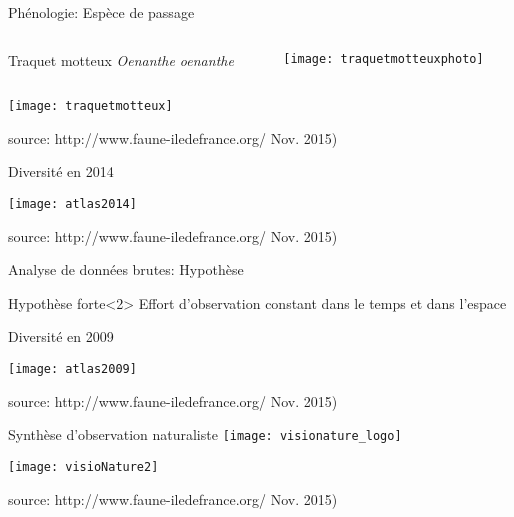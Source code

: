 \documentclass[10pt]{beamer}
\begin{document}
\begin{frame}{Phénologie: Espèce de passage}
 \begin{columns}
    \begin{column}[c]{0.7\textwidth}
   Traquet motteux \textit{Oenanthe oenanthe}
    \end{column}
    \begin{column}[c]{0.30\textwidth}
     \begin{center}
        \texttt{[image: traquetmotteuxphoto]}
  \end{center}
    \end{column}
  \end{columns}
    \begin{center}
        \texttt{[image: traquetmotteux]}
  \end{center}
  \footnotesize{source: http://www.faune-iledefrance.org/ Nov. 2015)}
\end{frame}


\begin{frame}{Diversité en 2014}
     \begin{center}
        \texttt{[image: atlas2014]}
  \end{center}
  \footnotesize{source: http://www.faune-iledefrance.org/ Nov. 2015)}
\end{frame}


\begin{frame}{Analyse de données brutes: Hypothèse}
     \begin{block}{Hypothèse forte}<2>
     Effort d'observation constant dans le temps et dans l'espace
     \end{block}
\end{frame}

\begin{frame}{Diversité en 2009}
     \begin{center}
        \texttt{[image: atlas2009]}
  \end{center}
 \footnotesize{source: http://www.faune-iledefrance.org/ Nov. 2015)} 
\end{frame}


\begin{frame}{Synthèse d'observation naturaliste}
 \texttt{[image: visionature\_logo]}\\
    \begin{center}
        \texttt{[image: visioNature2]}
  \end{center}
  \footnotesize{source: http://www.faune-iledefrance.org/ Nov. 2015)}
\end{frame}
\end{document}
